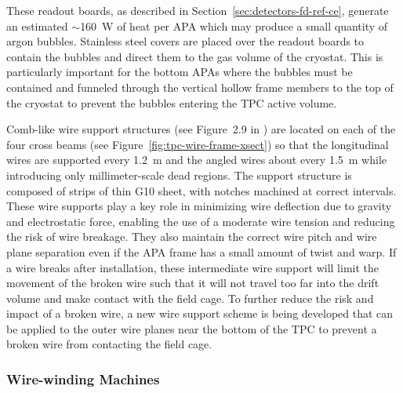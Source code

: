 These readout boards, as described in
Section~\ref{sec:detectors-fd-ref-ce}, generate an estimated
$\sim$160~W of heat per APA which may produce a small quantity of
argon bubbles.  Stainless steel covers are placed over the readout
boards to contain the bubbles and direct them to the gas volume of the
cryostat. This is particularly important for the bottom APAs where the
bubbles must be contained and funneled through the vertical hollow
frame members to the top of the cryostat to prevent the bubbles
entering the TPC active volume.

Comb-like wire support structures (see Figure~2.9 in \anxlbnefd) are
located on each of the four cross beams (see Figure~\ref{fig:tpc-wire-frame-xsect})
 so that the longitudinal wires
are supported every 1.2~m and the angled wires about every 1.5~m while
introducing only millimeter-scale dead regions. The support structure
is composed of strips of thin G10 sheet, with notches machined at
correct intervals.  These wire supports play a key role in minimizing
wire deflection due to gravity and electrostatic force, enabling the
use of a moderate wire tension and reducing the risk of wire breakage.
They also maintain the correct wire pitch and wire plane separation
even if the APA frame has a small amount of twist and warp.  If a wire
breaks after installation, these intermediate wire support will limit
the movement of the broken wire such that it will not travel too far
into the drift volume and make contact with the field cage.  To
further reduce the risk and impact of a broken wire, a new wire
support scheme is being developed that can be applied to the outer
wire planes near the bottom of the TPC to prevent a broken wire from
contacting the field cage.


\subsubsection{Wire-winding Machines}
\label{subsec:fd-ref-wirewinding}

